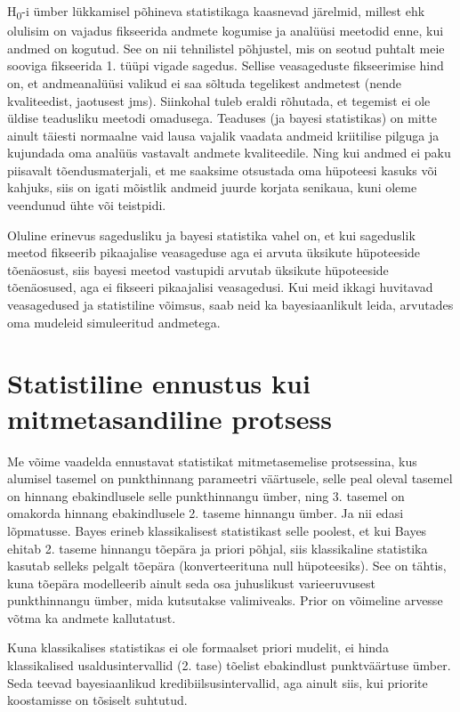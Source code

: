 \documentclass[]{book}
\begin{document}
H\textsubscript{0}-i ümber lükkamisel põhineva statistikaga kaasnevad
järelmid, millest ehk olulisim on vajadus fikseerida andmete kogumise ja
analüüsi meetodid enne, kui andmed on kogutud. See on nii tehnilistel
põhjustel, mis on seotud puhtalt meie sooviga fikseerida 1. tüüpi vigade
sagedus. Sellise veasageduste fikseerimise hind on, et andmeanalüüsi
valikud ei saa sõltuda tegelikest andmetest (nende kvaliteedist,
jaotusest jms). Siinkohal tuleb eraldi rõhutada, et tegemist ei ole
üldise teadusliku meetodi omadusega. Teaduses (ja bayesi statistikas) on
mitte ainult täiesti normaalne vaid lausa vajalik vaadata andmeid
kriitilise pilguga ja kujundada oma analüüs vastavalt andmete
kvaliteedile. Ning kui andmed ei paku piisavalt tõendusmaterjali, et me
saaksime otsustada oma hüpoteesi kasuks või kahjuks, siis on igati
mõistlik andmeid juurde korjata senikaua, kuni oleme veendunud ühte või
teistpidi.

Oluline erinevus sagedusliku ja bayesi statistika vahel on, et kui
sageduslik meetod fikseerib pikaajalise veasageduse aga ei arvuta
üksikute hüpoteeside tõenäosust, siis bayesi meetod vastupidi arvutab
üksikute hüpoteeside tõenäosused, aga ei fikseeri pikaajalisi
veasagedusi. Kui meid ikkagi huvitavad veasagedused ja statistiline
võimsus, saab neid ka bayesiaanlikult leida, arvutades oma mudeleid
simuleeritud andmetega.

\section*{Statistiline ennustus kui mitmetasandiline
protsess}\label{statistiline-ennustus-kui-mitmetasandiline-protsess}

Me võime vaadelda ennustavat statistikat mitmetasemelise protsessina,
kus alumisel tasemel on punkthinnang parameetri väärtusele, selle peal
oleval tasemel on hinnang ebakindlusele selle punkthinnangu ümber, ning
3. tasemel on omakorda hinnang ebakindlusele 2. taseme hinnangu ümber.
Ja nii edasi lõpmatusse. Bayes erineb klassikalisest statistikast selle
poolest, et kui Bayes ehitab 2. taseme hinnangu tõepära ja priori
põhjal, siis klassikaline statistika kasutab selleks pelgalt tõepära
(konverteerituna null hüpoteesiks). See on tähtis, kuna tõepära
modelleerib ainult seda osa juhuslikust varieeruvusest punkthinnangu
ümber, mida kutsutakse valimiveaks. Prior on võimeline arvesse võtma ka
andmete kallutatust.

Kuna klassikalises statistikas ei ole formaalset priori mudelit, ei
hinda klassikalised usaldusintervallid (2. tase) tõelist ebakindlust
punktväärtuse ümber. Seda teevad bayesiaanlikud kredibiilsusintervallid,
aga ainult siis, kui priorite koostamisse on tõsiselt suhtutud.
\end{document}
